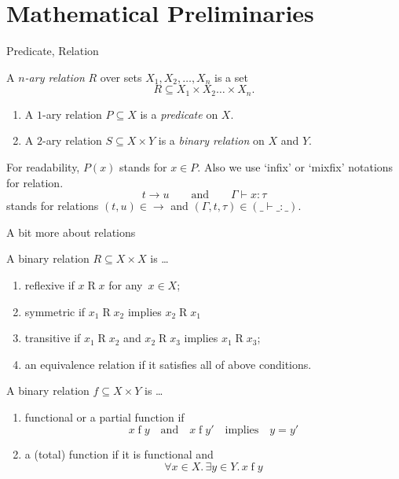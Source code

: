 \section{Mathematical Preliminaries}

\begin{frame}{Predicate, Relation}
  \begin{definition}
    A \emph{$n$-ary relation} $R$ over sets $X_1, X_2, \ldots,
    X_n$ is a set
    \[
      R \subseteq X_1 \times X_2 \dots \times X_n. 
    \]
  \end{definition}
  \begin{definition}

    \begin{enumerate}
      \item A $1$-ary relation $P \subseteq X$ is a \emph{predicate} on $X$. 
      \item A $2$-ary relation $S \subseteq X \times Y$ is a \emph{binary
        relation} on $X$ and $Y$.
    \end{enumerate}
  \end{definition}
    For readability, $P(x)$ stands for $x \in P$. Also we use `infix' or
    `mixfix' notations for relation.
      \[
        t \longrightarrow u\qquad\text{and}\qquad \Gamma \vdash x : \tau
      \]
      stands for relations $(t, u) \in {\longrightarrow}$ and $ (\Gamma, t, \tau) \in
      (\_\vdash\_:\_)$.
\end{frame}

\begin{frame}{A bit more about relations}

  A binary relation $R \subseteq X \times X$ is \ldots
  \begin{enumerate}
    \item \alert{reflexive} if $x\mathbin{R}x$ for any~$x \in X$;
    \item \alert{symmetric} if $x_1 \mathbin{R} x_2$ implies $x_2 \mathbin{R} x_1$
    \item \alert{transitive} if $x_1 \mathbin{R}
      x_2$ and $x_2 \mathbin{R} x_3$ implies $x_1 \mathbin{R} x_3$;
    \item an \alert{equivalence relation} if it satisfies all of above conditions.
  \end{enumerate}

  A binary relation $f \subseteq X \times Y$ is \ldots
  \begin{enumerate}
    \item \alert{functional} or a \alert{partial function} if 
      \[
        x \mathrel{f} y \quad\text{and}\quad
        x \mathrel{f} y' \quad\text{implies}\quad y = y'
      \]
    \item a \alert{(total) function} if it is functional and
      \[
        \forall x \in X.\, \exists y \in Y.\, x \mathrel{f} y
      \]
  \end{enumerate}
\end{frame}

